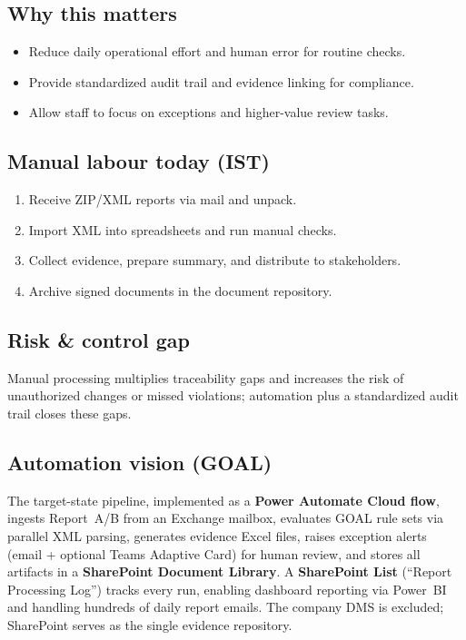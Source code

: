 \documentclass[11pt,a4paper]{article}
\begin{document}
\subsection*{Why this matters}
\begin{itemize}[leftmargin=*, nosep]
  \item Reduce daily operational effort and human error for routine checks.
  \item Provide standardized audit trail and evidence linking for compliance.
  \item Allow staff to focus on exceptions and higher-value review tasks.
\end{itemize}

\subsection*{Manual labour today (IST)}
\begin{enumerate}[leftmargin=*, nosep]
  \item Receive ZIP/XML reports via mail and unpack.
  \item Import XML into spreadsheets and run manual checks.
  \item Collect evidence, prepare summary, and distribute to stakeholders.
  \item Archive signed documents in the document repository.
\end{enumerate}

\subsection*{Risk \& control gap}
\begin{tcolorbox}[colback=ISAAIWarnBg,colframe=yellow!50!black,arc=2pt]
Manual processing multiplies traceability gaps and increases the risk of unauthorized changes or missed violations; automation plus a standardized audit trail closes these gaps.
\end{tcolorbox}

\subsection*{Automation vision (GOAL)}
The target-state pipeline, implemented as a \textbf{Power Automate Cloud flow}, ingests Report~A/B from an Exchange mailbox, evaluates GOAL rule sets via parallel XML parsing, generates evidence Excel files, raises exception alerts (email + optional Teams Adaptive Card) for human review, and stores all artifacts in a \textbf{SharePoint Document Library}. A \textbf{SharePoint List} (``Report Processing Log'') tracks every run, enabling dashboard reporting via Power~BI and handling hundreds of daily report emails. The company DMS is excluded; SharePoint serves as the single evidence repository.
\end{document}
